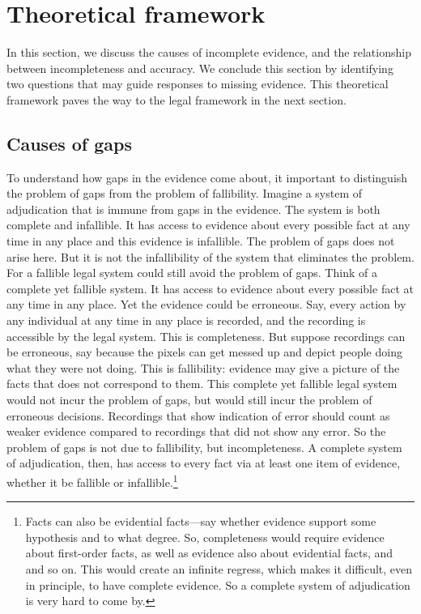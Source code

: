 \documentclass[
  10pt,
  dvipsnames,enabledeprecatedfontcommands]{scrartcl}
\begin{document}
\hypertarget{theoretical-framework}{%
\section{Theoretical framework}\label{theoretical-framework}}

In this section, we discuss the causes of incomplete evidence, and the
relationship between incompleteness and accuracy. We conclude this
section by identifying two questions that may guide responses to missing
evidence. This theoretical framework paves the way to the legal
framework in the next section.

\hypertarget{causes-of-gaps}{%
\subsection{Causes of gaps}\label{causes-of-gaps}}

To understand how gaps in the evidence come about, it important to
distinguish the problem of gaps from the problem of fallibility. Imagine
a system of adjudication that is immune from gaps in the evidence. The
system is both complete and infallible. It has access to evidence about
every possible fact at any time in any place and this evidence is
infallible. The problem of gaps does not arise here. But it is not the
infallibility of the system that eliminates the problem. For a fallible
legal system could still avoid the problem of gaps. Think of a complete
yet fallible system. It has access to evidence about every possible fact
at any time in any place. Yet the evidence could be erroneous. Say,
every action by any individual at any time in any place is recorded, and
the recording is accessible by the legal system. This is completeness.
But suppose recordings can be erroneous, say because the pixels can get
messed up and depict people doing what they were not doing. This is
fallibility: evidence may give a picture of the facts that does not
correspond to them. This complete yet fallible legal system would not
incur the problem of gaps, but would still incur the problem of
erroneous decisions. Recordings that show indication of error should
count as weaker evidence compared to recordings that did not show any
error. So the problem of gaps is not due to fallibility, but
incompleteness. A complete system of adjudication, then, has access to
every fact via at least one item of evidence, whether it be fallible or
infallible.\footnote{Facts can also be evidential facts---say whether
  evidence support some hypothesis and to what degree. So, completeness
  would require evidence about first-order facts, as well as evidence
  also about evidential facts, and and so on. This would create an
  infinite regress, which makes it difficult, even in principle, to have
  complete evidence. So a complete system of adjudication is very hard
  to come by.}
\end{document}
